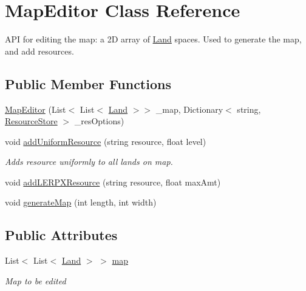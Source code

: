 \hypertarget{class_map_editor}{}\section{Map\+Editor Class Reference}
\label{class_map_editor}


A\+PI for editing the map\+: a 2D array of \mbox{\hyperlink{class_land}{Land}} spaces. Used to generate the map, and add resources.  


\subsection*{Public Member Functions}
\begin{DoxyCompactItemize}
\item 
\mbox{\hyperlink{class_map_editor_acc8af16a98b138b39e1c0e8f3d3ad83b}{Map\+Editor}} (List$<$ List$<$ \mbox{\hyperlink{class_land}{Land}} $>$$>$ \+\_\+map, Dictionary$<$ string, \mbox{\hyperlink{class_resource_store}{Resource\+Store}} $>$ \+\_\+res\+Options)
\item 
void \mbox{\hyperlink{class_map_editor_af0faf8e47a1ed57ada0e1d1f56b64be4}{add\+Uniform\+Resource}} (string resource, float level)
\begin{DoxyCompactList}\small\item\em Adds resource uniformly to all lands on map. \end{DoxyCompactList}\item 
void \mbox{\hyperlink{class_map_editor_a3f0e4bacb89992b0aa0aaa4f17aafd28}{add\+L\+E\+R\+P\+X\+Resource}} (string resource, float max\+Amt)
\item 
void \mbox{\hyperlink{class_map_editor_a3da89d803fa558eb9cc071a604f4351c}{generate\+Map}} (int length, int width)
\end{DoxyCompactItemize}
\subsection*{Public Attributes}
\begin{DoxyCompactItemize}
\item 
List$<$ List$<$ \mbox{\hyperlink{class_land}{Land}} $>$ $>$ \mbox{\hyperlink{class_map_editor_a3899ec34c7e9acb6cd8b98434504e726}{map}}
\begin{DoxyCompactList}\small\item\em Map to be edited \end{DoxyCompactList}\end{DoxyCompactItemize}


